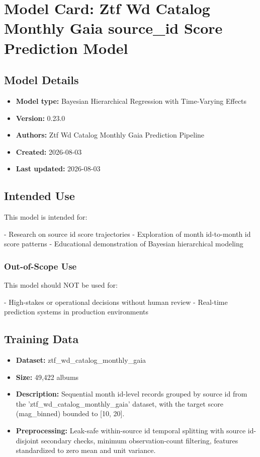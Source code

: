 \documentclass{article}
\begin{document}
\section*{Model Card: Ztf Wd Catalog Monthly Gaia source\_id Score Prediction Model}

\subsection*{Model Details}
\begin{itemize}
  \item \textbf{Model type:} Bayesian Hierarchical Regression with Time-Varying Effects
  \item \textbf{Version:} 0.23.0
  \item \textbf{Authors:} Ztf Wd Catalog Monthly Gaia Prediction Pipeline
  \item \textbf{Created:} 2026-08-03
  \item \textbf{Last updated:} 2026-08-03
\end{itemize}

\subsection*{Intended Use}
This model is intended for:

- Research on source id score trajectories
- Exploration of month id-to-month id score patterns
- Educational demonstration of Bayesian hierarchical modeling

\subsubsection*{Out-of-Scope Use}
This model should NOT be used for:

- High-stakes or operational decisions without human review
- Real-time prediction systems in production environments

\subsection*{Training Data}
\begin{itemize}
  \item \textbf{Dataset:} ztf\_wd\_catalog\_monthly\_gaia
  \item \textbf{Size:} 49,422 albums
  \item \textbf{Description:} Sequential month id-level records grouped by source id from the 'ztf\_wd\_catalog\_monthly\_gaia' dataset, with the target score (mag\_binned) bounded to [10, 20].
  \item \textbf{Preprocessing:} Leak-safe within-source id temporal splitting with source id-disjoint secondary checks, minimum observation-count filtering, features standardized to zero mean and unit variance.
\end{itemize}
\end{document}

